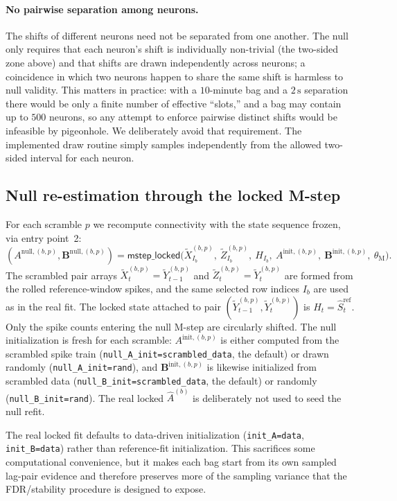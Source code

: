 \documentclass[11pt]{article}
\begin{document}
\paragraph{No pairwise separation among neurons.} The shifts of different
neurons need not be separated from one another. The null only requires that
each neuron's shift is individually non-trivial (the two-sided zone above)
and that shifts are drawn independently across neurons; a coincidence in
which two neurons happen to share the same shift is harmless to null
validity. This matters in practice: with a \(10\)-minute bag and a
\(2\,\text{s}\) separation there would be only a finite number of effective
``slots,'' and a bag may contain up to \(500\) neurons, so any attempt to enforce pairwise
distinct shifts would be infeasible by pigeonhole. We deliberately avoid
that requirement. The implemented draw routine simply samples independently
from the allowed two-sided interval for each neuron.

\subsection{Null re-estimation through the locked M-step}

For each scramble \(p\) we recompute connectivity with the state sequence
frozen, via entry point~2:
\[
(A^{\text{null},(b,p)},\mathbf B^{\text{null},(b,p)})
=\textsf{mstep\_locked}\!\big(\tilde X^{(b,p)}_{I_b},\ \tilde Z^{(b,p)}_{I_b},\
H_{I_b},\ A^{\text{init},(b,p)},\
\mathbf B^{\text{init},(b,p)},\ \theta_{\text{M}}\big).
\]
The scrambled pair arrays \(\tilde X^{(b,p)}_t=\tilde Y^{(b,p)}_{t-1}\) and
\(\tilde Z^{(b,p)}_t=\tilde Y^{(b,p)}_t\) are formed from the rolled
reference-window spikes, and the same selected row indices \(I_b\) are used
as in the real fit. The locked state attached to pair
\((\tilde Y^{(b,p)}_{t-1},\tilde Y^{(b,p)}_t)\) is
\(H_t=\hat S^{\text{ref}}_t\). Only the spike counts entering the null
M-step are circularly shifted. The null initialization is fresh for each
scramble: \(A^{\text{init},(b,p)}\) is either computed from the
scrambled spike train (\texttt{null\_A\_init=scrambled\_data}, the default) or drawn
randomly (\texttt{null\_A\_init=rand}), and
\(\mathbf B^{\text{init},(b,p)}\) is likewise initialized from scrambled
data (\texttt{null\_B\_init=scrambled\_data}, the default) or randomly
(\texttt{null\_B\_init=rand}). The real locked
\(\hat A^{(b)}\) is deliberately not used to seed the null refit.

The real locked fit defaults to data-driven initialization
(\texttt{init\_A=data}, \texttt{init\_B=data}) rather than reference-fit
initialization. This sacrifices some computational convenience, but it makes
each bag start from its own sampled lag-pair evidence and therefore preserves
more of the sampling variance that the FDR/stability procedure is designed
to expose.
\end{document}

